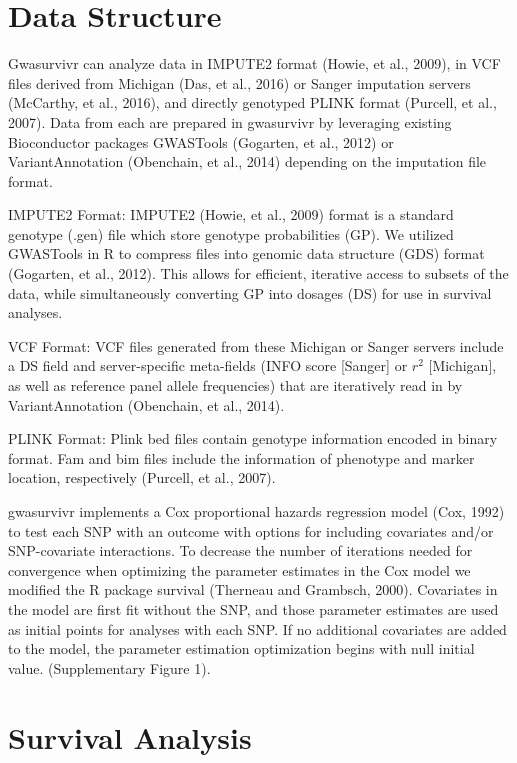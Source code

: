 \documentclass[]{DissertateUSU}
\begin{document}
\section{Data Structure}\label{data-structure}

Gwasurvivr can analyze data in IMPUTE2 format (Howie, et al., 2009), in
VCF files derived from Michigan (Das, et al., 2016) or Sanger imputation
servers (McCarthy, et al., 2016), and directly genotyped PLINK format
(Purcell, et al., 2007). Data from each are prepared in gwasurvivr by
leveraging existing Bioconductor packages GWASTools (Gogarten, et al.,
2012) or VariantAnnotation (Obenchain, et al., 2014) depending on the
imputation file format.

IMPUTE2 Format: IMPUTE2 (Howie, et al., 2009) format is a standard
genotype (.gen) file which store genotype probabilities (GP). We
utilized GWASTools in R to compress files into genomic data structure
(GDS) format (Gogarten, et al., 2012). This allows for efficient,
iterative access to subsets of the data, while simultaneously converting
GP into dosages (DS) for use in survival analyses.

VCF Format: VCF files generated from these Michigan or Sanger servers
include a DS field and server-specific meta-fields (INFO score
{[}Sanger{]} or \(r^2\) {[}Michigan{]}, as well as reference panel
allele frequencies) that are iteratively read in by VariantAnnotation
(Obenchain, et al., 2014).

PLINK Format: Plink bed files contain genotype information encoded in
binary format. Fam and bim files include the information of phenotype
and marker location, respectively (Purcell, et al., 2007).

gwasurvivr implements a Cox proportional hazards regression model (Cox,
1992) to test each SNP with an outcome with options for including
covariates and/or SNP-covariate interactions. To decrease the number of
iterations needed for convergence when optimizing the parameter
estimates in the Cox model we modified the R package survival (Therneau
and Grambsch, 2000). Covariates in the model are first fit without the
SNP, and those parameter estimates are used as initial points for
analyses with each SNP. If no additional covariates are added to the
model, the parameter estimation optimization begins with null initial
value. (Supplementary Figure 1).

\section{Survival Analysis}\label{survival-analysis}
\end{document}
